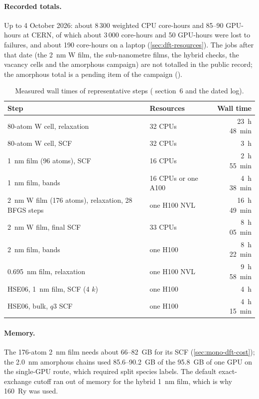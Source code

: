 \paragraph{Recorded totals.} Up to 4 October 2026: about 8\,300 weighted CPU core-hours and 85--90 GPU-hours at CERN, of
which about 3\,000 core-hours and 50 GPU-hours were lost to failures, and about 190 core-hours on a laptop
(\cref{sec:dft-resources}). The jobs after that date (the 2~nm W film, the sub-nanometre films, the hybrid checks, the
vacancy cells and the amorphous campaign) are not totalled in the public record; the amorphous total is a pending item
of the campaign ().

\begin{table}[htbp]\centering\small
\caption{Measured wall times of representative steps ( section~6 and the dated log).}
\label{tab:mono-res-dft}
\begin{tabular}{llr}\toprule
Step & Resources & Wall time \\\midrule
80-atom W cell, relaxation & 32 CPUs & 23~h 48~min \\
80-atom W cell, SCF & 32 CPUs & 3~h \\
1~nm film (96 atoms), SCF & 16 CPUs & 2~h 55~min \\
1~nm film, bands & 16 CPUs or one A100 & 4~h 38~min \\
2~nm W film (176 atoms), relaxation, 28 BFGS steps & one H100 NVL & 16~h 49~min \\
2~nm W film, final SCF & 33 CPUs & 8~h 05~min \\
2~nm film, bands & one H100 & 8~h 22~min \\
0.695~nm film, relaxation & one H100 NVL & 9~h 58~min \\
HSE06, 1~nm film, SCF (4 $k$) & one H100 & 4~h \\
HSE06, bulk, $q3$ SCF & one H100 & 4~h 15~min \\\bottomrule
\end{tabular}
\end{table}

\paragraph{Memory.} The 176-atom 2~nm film needs about 66--82~GB for its SCF (\cref{sec:mono-dft-cost}); the 2.0~nm
amorphous chains used 85.6--90.2~GB of the 95.8~GB of one GPU on the single-GPU route, which required split species
labels. The default exact-exchange cutoff ran out of memory for the hybrid 1~nm film, which is why 160~Ry was used.

